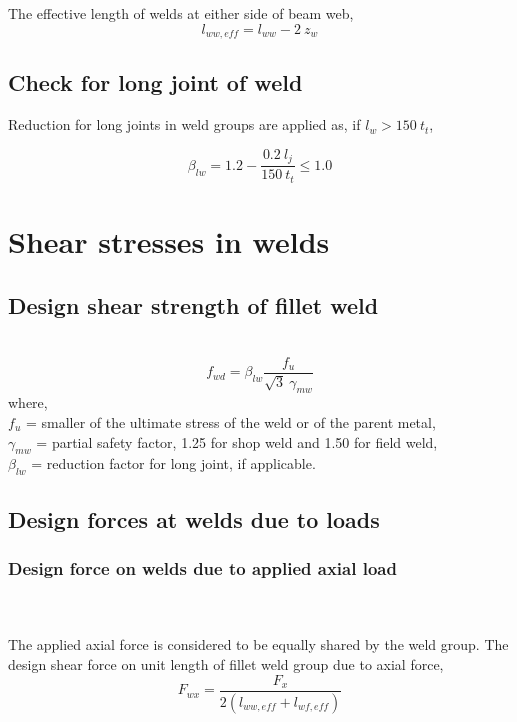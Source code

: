 \documentclass[11.5pt,a4paper,oneside]{report}
\begin{document}
\begin{Form}
The effective length of welds at either side of beam web, \\

\begin{equation}
	l_{ww,eff} = l_{ww}-2~z_w
\end{equation}


\subsection{Check for long joint of weld}
Reduction for long joints in weld groups are applied as,
if $l_w > 150~t_t$,

\begin{equation}
	\beta_{lw}=1.2-\frac{0.2~l_j}{150~t_t} \le 1.0
\end{equation}


\section{Shear stresses in welds}

\subsection{Design shear strength of fillet weld}
\quad \quad [Reference: Cl. 10.5.7.1.1, IS 800:2007] \\

\begin{equation}
	f_{wd} = \beta_{lw} \frac{f_u}{\sqrt{3}~\gamma_{mw}}
\end{equation}
where, \\
\indent $f_u$ = smaller of the ultimate stress of the weld or of the parent metal, \\
\indent $\gamma_{mw}$ = partial safety factor, 1.25 for shop weld and 1.50 for field weld, \\
\indent $\beta_{lw}$ = reduction factor for long joint, if applicable. \\

\subsection{Design forces at welds due to loads}

\subsubsection{Design force on welds due to applied axial load}
\quad \quad[Reference: Cl. 10.11.2.1(a), IS 800:2007] \\ \\
The applied axial force is considered to be equally shared by the weld group.
The design shear force on unit length of fillet weld group due to axial force,
\begin{equation}
	F_{wx} = \frac{F_x}{2(l_{ww,eff} + l_{wf,eff})}
\end{equation}


\end{Form}
\end{document}
